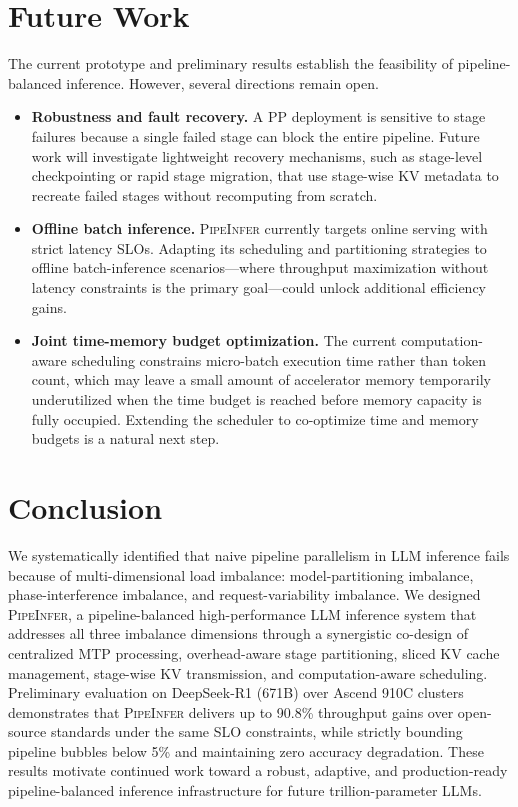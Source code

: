 \documentclass[12pt,a4paper]{article}
\newcommand{\sys}{\textsc{PipeInfer}\xspace}
\newcommand{\modelimb}{model-partitioning imbalance\xspace}
\newcommand{\phaseimb}{phase-interference imbalance\xspace}
\newcommand{\requestimb}{request-variability imbalance\xspace}
\newcommand{\centralmtp}{centralized MTP processing\xspace}
\newcommand{\overheadpartition}{overhead-aware stage partitioning\xspace}
\newcommand{\slicedkv}{sliced KV cache management\xspace}
\newcommand{\stagekv}{stage-wise KV transmission\xspace}
\newcommand{\timesched}{computation-aware scheduling\xspace}
\newcommand{\vllmgain}{90.8\%\xspace}
\newcommand{\bubblecap}{5\%\xspace}
\begin{document}
\section{Future Work}
The current prototype and preliminary results establish the feasibility of pipeline-balanced inference.
However, several directions remain open.

\begin{itemize}[leftmargin=*]
    \item \textbf{Robustness and fault recovery.}
    A PP deployment is sensitive to stage failures because a single failed stage can block the entire pipeline.
    Future work will investigate lightweight recovery mechanisms, such as stage-level checkpointing or rapid stage migration, that use stage-wise KV metadata to recreate failed stages without recomputing from scratch.

    \item \textbf{Offline batch inference.}
    \sys currently targets online serving with strict latency SLOs.
    Adapting its scheduling and partitioning strategies to offline batch-inference scenarios---where throughput maximization without latency constraints is the primary goal---could unlock additional efficiency gains.

    \item \textbf{Joint time-memory budget optimization.}
    The current \timesched constrains micro-batch execution time rather than token count, which may leave a small amount of accelerator memory temporarily underutilized when the time budget is reached before memory capacity is fully occupied.
    Extending the scheduler to co-optimize time and memory budgets is a natural next step.
\end{itemize}

\section{Conclusion}

We systematically identified that naive pipeline parallelism in LLM inference fails because of multi-dimensional load imbalance: \modelimb, \phaseimb, and \requestimb.
We designed \sys, a pipeline-balanced high-performance LLM inference system that addresses all three imbalance dimensions through a synergistic co-design of \centralmtp, \overheadpartition, \slicedkv, \stagekv, and \timesched.
Preliminary evaluation on DeepSeek-R1 (671B) over Ascend 910C clusters demonstrates that \sys delivers up to \vllmgain throughput gains over open-source standards under the same SLO constraints, while strictly bounding pipeline bubbles below \bubblecap and maintaining zero accuracy degradation.
These results motivate continued work toward a robust, adaptive, and production-ready pipeline-balanced inference infrastructure for future trillion-parameter LLMs.


\newpage


\end{document}
